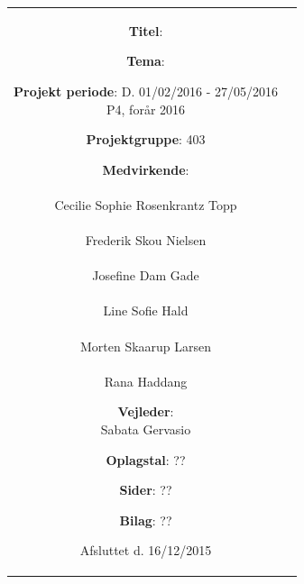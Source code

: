 \begin{nopagebreak}
{\begin{tabular}{cc}
\parbox{7cm}{
\begin{description}
{\setlength{\parindent}{0cm}
\item \textbf{Titel}: \\
\item \textbf{Tema}: \\
\item \textbf{Projekt periode}: D. 01/02/2016 - 27/05/2016\\
   P4, forår 2016\\
  \hspace{4cm}
\item \textbf{Projektgruppe}: 403 \\
  \hspace{4cm}
\item \textbf{Medvirkende}:\\
\underline{\hspace{4cm}}\\
Cecilie Sophie Rosenkrantz Topp  \\
\underline{\hspace{4cm}}\\
Frederik Skou Nielsen \\
\underline{\hspace{4cm}}\\
Josefine Dam Gade \\
\underline{\hspace{4cm}}\\
Line Sofie Hald \\
\underline{\hspace{4cm}}\\
Morten Skaarup Larsen \\
\underline{\hspace{4cm}}\\
Rana Haddang \\
\hspace{1cm}
\item \textbf{Vejleder}:\\
Sabata Gervasio  \\
}
  
\end{description}

\begin{description}
\item {\textbf{Oplagstal}: ??}
\item \textbf{Sider}: ?? 
\item \textbf{Bilag}: ??
\item {Afsluttet d. 16/12/2015} 
\end{description}

}
\end{tabular}}
\end{nopagebreak}
